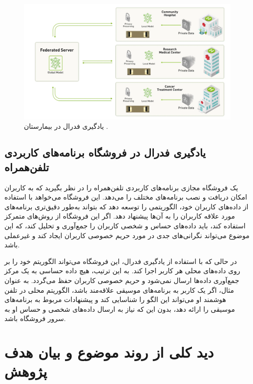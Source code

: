 \begin{figure}[b!]
	\centering
	\includegraphics[scale=1]{images/chap1/hospital.png}%
	\caption{%
		یادگیری فدرال در بیمارستان
		\cite{rieke2019what}%
		.
	}
	\label{hospital}
	\centering
\end{figure}



\subsection{
	یادگیری فدرال در فروشگاه برنامه‌های کاربردی%
	تلفن‌همراه
}
یک فروشگاه مجازی برنامه‌های کاربردی تلفن‌همراه را در نظر بگیرید که به کاربران امکان دریافت و نصب برنامه‌های مختلف را می‌دهد. این فروشگاه می‌خواهد با استفاده از داده‌های کاربران خود، الگوریتمی را توسعه دهد که بتواند به‌طور دقیق‌تری برنامه‌های مورد علاقه کاربران را به آن‌ها پیشنهاد دهد. اگر این فروشگاه از روش‌های متمرکز استفاده کند، باید داده‌های حساس و شخصی کاربران را جمع‌آوری و تحلیل کند، که این موضوع می‌تواند نگرانی‌های جدی در مورد حریم خصوصی کاربران ایجاد کند و غیرعملی باشد.

در حالی که با استفاده از یادگیری فدرال، این فروشگاه می‌تواند الگوریتم خود را بر روی داده‌های محلی هر کاربر اجرا کند. به این ترتیب، هیچ داده حساسی به یک مرکز جمع‌آوری داده‌ها ارسال نمی‌شود و حریم خصوصی کاربران حفظ می‌گردد. به عنوان مثال، اگر یک کاربر به برنامه‌های موسیقی علاقه‌مند باشد، الگوریتم محلی در تلفن هوشمند او می‌تواند این الگو را شناسایی کند و پیشنهادات مربوط به برنامه‌های موسیقی را ارائه دهد، بدون این که نیاز به ارسال داده‌های شخصی و حساس او به سرور فروشگاه باشد.


\section{دید کلی از روند موضوع و بیان هدف پژوهش}

